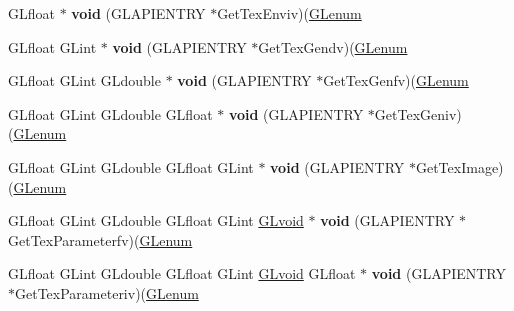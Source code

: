 \begin{DoxyCompactItemize}
\item 
\mbox{\label{struct_____g_ldispatch_table_rec_a73a56fc03bf300492c122d3fbdb6aa5a}} 
G\+Lfloat $\ast$ {\bfseries void} (G\+L\+A\+P\+I\+E\+N\+T\+RY $\ast$Get\+Tex\+Enviv)(\hyperlink{interfacevoid}{G\+Lenum}
\item 
\mbox{\label{struct_____g_ldispatch_table_rec_a56d5e32d662af313d9f1a6cb54f88e01}} 
G\+Lfloat G\+Lint $\ast$ {\bfseries void} (G\+L\+A\+P\+I\+E\+N\+T\+RY $\ast$Get\+Tex\+Gendv)(\hyperlink{interfacevoid}{G\+Lenum}
\item 
\mbox{\label{struct_____g_ldispatch_table_rec_a108b697a9265035016c1eea019221962}} 
G\+Lfloat G\+Lint G\+Ldouble $\ast$ {\bfseries void} (G\+L\+A\+P\+I\+E\+N\+T\+RY $\ast$Get\+Tex\+Genfv)(\hyperlink{interfacevoid}{G\+Lenum}
\item 
\mbox{\label{struct_____g_ldispatch_table_rec_a06deb6943c62e5f8ae2e1957b1a95011}} 
G\+Lfloat G\+Lint G\+Ldouble G\+Lfloat $\ast$ {\bfseries void} (G\+L\+A\+P\+I\+E\+N\+T\+RY $\ast$Get\+Tex\+Geniv)(\hyperlink{interfacevoid}{G\+Lenum}
\item 
\mbox{\label{struct_____g_ldispatch_table_rec_ab8d04c93c1d614c6f734ae1bf140da34}} 
G\+Lfloat G\+Lint G\+Ldouble G\+Lfloat G\+Lint $\ast$ {\bfseries void} (G\+L\+A\+P\+I\+E\+N\+T\+RY $\ast$Get\+Tex\+Image)(\hyperlink{interfacevoid}{G\+Lenum}
\item 
\mbox{\label{struct_____g_ldispatch_table_rec_a8699ac5163f9e39ada7b2170a8d03284}} 
G\+Lfloat G\+Lint G\+Ldouble G\+Lfloat G\+Lint \hyperlink{interfacevoid}{G\+Lvoid} $\ast$ {\bfseries void} (G\+L\+A\+P\+I\+E\+N\+T\+RY $\ast$Get\+Tex\+Parameterfv)(\hyperlink{interfacevoid}{G\+Lenum}
\item 
\mbox{\label{struct_____g_ldispatch_table_rec_a67fc5178d835515ea5062c7b767034ea}} 
G\+Lfloat G\+Lint G\+Ldouble G\+Lfloat G\+Lint \hyperlink{interfacevoid}{G\+Lvoid} G\+Lfloat $\ast$ {\bfseries void} (G\+L\+A\+P\+I\+E\+N\+T\+RY $\ast$Get\+Tex\+Parameteriv)(\hyperlink{interfacevoid}{G\+Lenum}
\item 

\end{DoxyCompactItemize}
